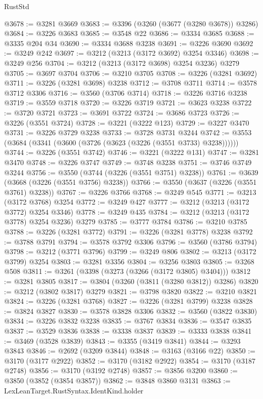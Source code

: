 \begin{lexlean}{RustStd}
\begin{coremodule}
{\begin{coremodule}
{{{{{{{{{{{{{{{{{{{{{{{{{{@3678 := @3281 @3669
@3683 := @3396 (@3260 (@3677 (@3280 @3678)) @3286)
@3684 := @3226 @3683
@3685 := @3548 @22
@3686 := @3334 @3685
@3688 := @3335 @204 @34
@3690 := @3334 @3688 @3238
@3691 := @3226 @3690
@3692 := @3249 @242
@3697 := @3212 (@3213 (@3172 @3692) @3254 @3346)
@3698 := @3249 @256
@3704 := @3212 (@3213 (@3172 @3698) @3254 @3236) @3279
@3705 := @3697 @3704
@3706 := @3210 @3705
@3708 := @3226 (@3281 @3692)
@3711 := @3226 (@3281 @3698) @3238
@3712 := @3708 @3711
@3714 := @3578 @3712 @3306
@3716 := @3560 (@3706 @3714)
@3718 := @3226 @3716 @3238
@3719 := @3559 @3718
@3720 := @3226 @3719
@3721 := @3623 @3238
@3722 := @3720 @3721
@3723 := @3691 @3722
@3724 := @3686 @3723
@3726 := @3226 (@3551 @3724)
@3728 := @3221 (@3222 @123)
@3729 := @3227 @3470
@3731 := @3226 @3729 @3238
@3733 := @3728 @3731 @3244
@3742 := @3553 (@3684 (@3341 (@3600 (@3726 (@3623 (@3226 (@3551 @3733) @3238))))))
@3744 := @3226 (@3551 @3742)
@3746 := @3221 (@3222 @131)
@3747 := @3281 @3470
@3748 := @3226 @3747
@3749 := @3748 @3238
@3751 := @3746 @3749 @3244
@3756 := @3550 (@3744 (@3226 (@3551 @3751) @3238))
@3761 := @3639 (@3668 (@3226 (@3551 @3756) @3238))
@3766 := @3550 (@3637 (@3226 (@3551 @3761) @3238))
@3767 := @3226 @3766
@3768 := @3249 @545
@3771 := @3213 (@3172 @3768) @3254
@3772 := @3249 @427
@3777 := @3212 (@3213 (@3172 @3772) @3254 @3346)
@3778 := @3249 @435
@3784 := @3212 (@3213 (@3172 @3778) @3254 @3236) @3279
@3785 := @3777 @3784
@3786 := @3210 @3785
@3788 := @3226 (@3281 @3772)
@3791 := @3226 (@3281 @3778) @3238
@3792 := @3788 @3791
@3794 := @3578 @3792 @3306
@3796 := @3560 (@3786 @3794)
@3798 := @3212 (@3771 @3796)
@3799 := @3249 @806
@3802 := @3213 (@3172 @3799) @3254
@3803 := @3281 @3356
@3804 := @3256 @3803
@3805 := @3268 @508
@3811 := @3261 (@3398 (@3273 (@3266 (@3172 @3805) @3404)))
@3812 := @3281 @3805
@3817 := @3804 (@3260 (@3811 (@3280 @3812)) @3286)
@3820 := @3212 (@3802 @3817) @3279
@3821 := @3798 @3820
@3822 := @3210 @3821
@3824 := @3226 (@3281 @3768)
@3827 := @3226 (@3281 @3799) @3238
@3828 := @3824 @3827
@3830 := @3578 @3828 @3306
@3832 := @3560 (@3822 @3830)
@3834 := @3226 @3832 @3238
@3835 := @3767 @3834
@3836 := @3547 @3835
@3837 := @3529 @3836
@3838 := @3338 @3837
@3839 := @3333 @3838
@3841 := @3469 (@3528 @3839)
@3843 := @3355 (@3419 @3841)
@3844 := @3293 @3843
@3846 := @2692 (@3209 @3844)
@3848 := @3163 (@3166 @22)
@3850 := @3170 (@3177 @2922)
@3852 := @3170 (@3182 @2922)
@3854 := @3170 (@3187 @2748)
@3856 := @3170 (@3192 @2748)
@3857 := @3856 @3200
@3860 := @3850 (@3852 (@3854 @3857))
@3862 := @3848 @3860 @3131
@3863 := LexLeanTarget.RustSyntax.IdentKind.holder
}}}}}}}}}}}}}}}}}}}}}}}}}}
\end{coremodule}}
\end{coremodule}
\end{lexlean}
